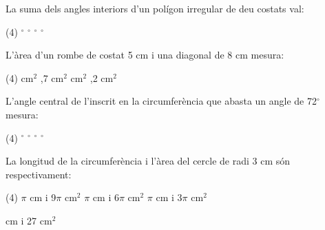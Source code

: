 \begin{autoaval}{50}
\begin{mylist}
\exer  La suma dels angles interiors d'un polígon irregular de deu costats val:

\begin{tasks}(4)
	${}^\circ$     
	${}^\circ$     
	${}^\circ$    
	${}^\circ$ 
\end{tasks}


\exer  L'àrea d'un rombe de costat 5 cm i una diagonal de 8 cm mesura:

\begin{tasks}(4)
	 cm${}^{2}$  
	,7 cm${}^{2}$  
	 cm${}^{2}$   
	,2 cm${}^{2}$
\end{tasks}

 


\exer  L'angle central de l'inscrit en la circumferència que abasta un angle de 72${}^\circ$  mesura: 

\begin{tasks}(4)
	${}^\circ$     
	${}^\circ$      
	${}^\circ$     
	${}^\circ$ 
\end{tasks}


\exer  La longitud de la circumferència i l'àrea del cercle de radi 3 cm són respectivament:

\begin{tasks}(4)
	$\pi$ cm i 9$\pi$ cm${}^{2}$ 
	$\pi$ cm i 6$\pi$ cm${}^{2}$  
	$\pi$ cm i 3$\pi$ cm${}^{2}$  


	 cm i 27 cm${}^{2}$
\end{tasks}

\end{mylist}

\end{autoaval} 


